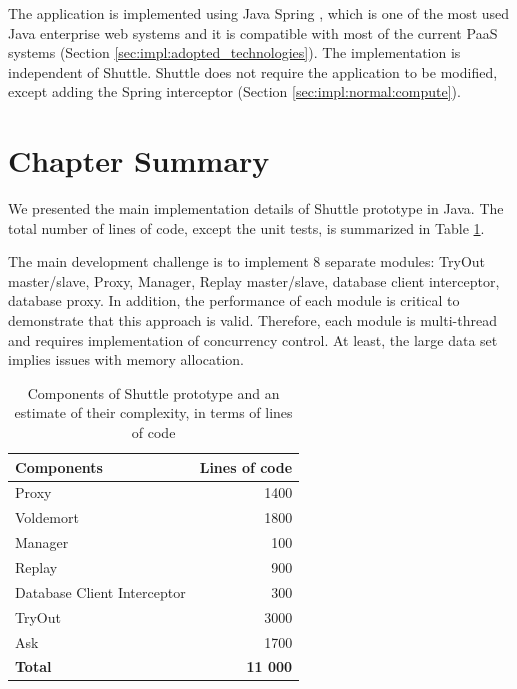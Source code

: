 The application is implemented using Java Spring \cite{spring}, which is one of the most used Java enterprise web systems and it is compatible with most of the current \ac{PaaS} systems (Section \ref{sec:impl:adopted_technologies}). The implementation is independent of Shuttle. Shuttle does not require the application to be modified, except adding the Spring interceptor (Section \ref{sec:impl:normal:compute}). 


\section{Chapter Summary}\label{sec:impl:summary}
We presented the main implementation details of Shuttle prototype in Java. The total number of lines of code, except the unit tests, is summarized in Table \ref{tab:lines_of_code}.

The main development challenge is to implement 8 separate modules: TryOut master/slave, Proxy, Manager, Replay master/slave, database client interceptor, database proxy. In addition, the performance of each module is critical to demonstrate that this approach is valid. Therefore, each module is multi-thread and requires implementation of concurrency control. At least, the large data set implies issues with memory allocation.

\begin{table}[ht]
\centering
\begin{tabular}{lr}
\textbf{Components} 		& \textbf{Lines of code} \\ \hline
Proxy                      	& 1400    			\\   
Voldemort                  	& 1800    			\\
Manager                    	& 100     			\\    
Replay 			           	& 900     			\\    
Database Client Interceptor & 300     			\\     
TryOut                      & 3000    			\\    
Ask                         & 1700    			\\  \hline  
\textbf{Total}              & \textbf{11 000}  \\        
\end{tabular}
	\caption[Components of Shuttle prototype and an estimate of their complexity]
			{Components of Shuttle prototype and an estimate of their complexity, in terms of lines of code}
	\label{tab:lines_of_code}
\end{table}

